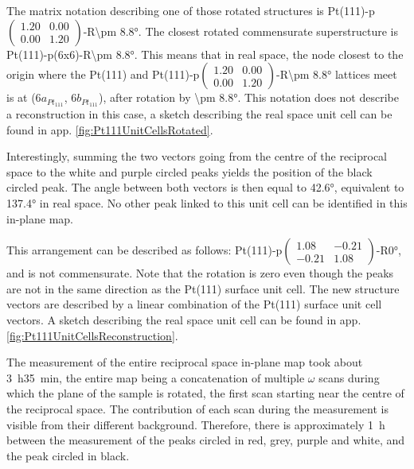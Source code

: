The matrix notation describing one of those rotated structures is Pt(111)-p$\begin{pmatrix} 1.20 & 0.00\\ 0.00 & 1.20 \end{pmatrix}$-R\ang{\pm 8.8}.
The closest rotated commensurate superstructure is Pt(111)-p(6x6)-R\ang{\pm 8.8}.
This means that in real space, the node closest to the origin where the Pt(111) and Pt(111)-p$\begin{pmatrix} 1.20 & 0.00\\ 0.00 & 1.20 \end{pmatrix}$-R\ang{\pm 8.8} lattices meet is at (6$a_{Pt_{111}}$, 6$b_{Pt_{111}}$), after rotation by \ang{\pm 8.8}.
This notation does not describe a reconstruction in this case, a sketch describing the real space unit cell can be found in app. \ref{fig:Pt111UnitCellsRotated}.

Interestingly, summing the two vectors going from the centre of the reciprocal space to the white and purple circled peaks yields the position of the black circled peak.
The angle between both vectors is then equal to \ang{42.6}, equivalent to \ang{137.4} in real space.
No other peak linked to this unit cell can be identified in this in-plane map.

This arrangement can be described as follows: Pt(111)-p$\begin{pmatrix} 1.08 & -0.21 \\ -0.21 & 1.08 \end{pmatrix}$-R\ang{0}, and is not commensurate.
Note that the rotation is zero even though the peaks are not in the same direction as the Pt(111) surface unit cell.
The new structure vectors are described by a linear combination of the Pt(111) surface unit cell vectors.
A sketch describing the real space unit cell can be found in app. \ref{fig:Pt111UnitCellsReconstruction}.

The measurement of the entire reciprocal space in-plane map took about \qty{3}{\hour}\qty{35}{\minute}, the entire map being a concatenation of multiple $\omega$ scans during which the plane of the sample is rotated, the first scan starting near the centre of the reciprocal space.
The contribution of each scan during the measurement is visible from their different background.
Therefore, there is approximately \qty{1}{\hour} between the measurement of the peaks circled in red, grey, purple and white, and the peak circled in black.

